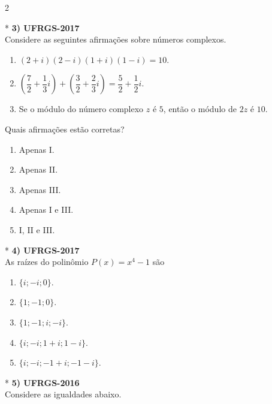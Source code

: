\documentclass[11pt,a4paper]{article}
\begin{document}
\begin{paracol}{2}
    \switchcolumn[1]
    \vspace{6.5cm}

    \switchcolumn[0]*
    \textbf{3) UFRGS-2017} \\
    Considere as seguintes afirmações sobre números complexos.

    \begin{enumerate}[label=\Roman*., itemsep=0.2cm]
        \item $(2+i)(2-i)(1+i)(1-i) = 10$.
        \item $\left(\dfrac{7}{2} + \dfrac{1}{3}i\right) + \left(\dfrac{3}{2} + \dfrac{2}{3}i\right) = \dfrac{5}{2} + \dfrac{1}{2}i$.
        \item Se o módulo do número complexo $z$ é $5$, então o módulo de $2z$ é $10$.
    \end{enumerate}

    Quais afirmações estão corretas?

    \begin{enumerate}[label=(\Alph*)]
        \item Apenas I.
        \item Apenas II.
        \item Apenas III.
        \item Apenas I e III.
        \item I, II e III.
    \end{enumerate}
    \vspace{0.4cm}

    \switchcolumn[1]
    \vspace{9.5cm}

    \switchcolumn[0]*
    \textbf{4) UFRGS-2017} \\
    As raízes do polinômio $P(x) = x^4 - 1$ são

    \begin{enumerate}[label=(\Alph*), itemsep=0.2cm]
        \item $\{i; -i; 0\}$.
        \item $\{1; -1; 0\}$.
        \item $\{1; -1; i; -i\}$.
        \item $\{i; -i; 1+i; 1-i\}$.
        \item $\{i; -i; -1+i; -1-i\}$.
    \end{enumerate}
    \vspace{0.4cm}

    \switchcolumn[1]
    \vspace{6cm}

    \switchcolumn[0]*
    \textbf{5) UFRGS-2016} \\
    Considere as igualdades abaixo.


\end{paracol}
\end{document}

